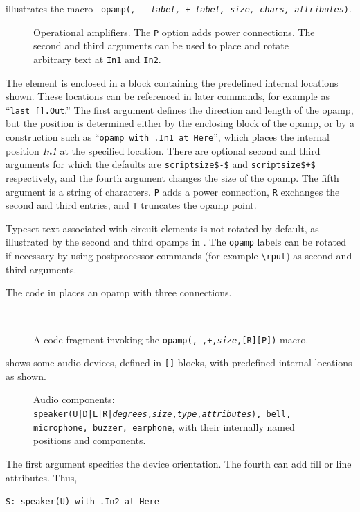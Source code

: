 \pagebreak
{} illustrates the macro {\tt
 opamp({\sl\linespec, - label, + label, size, chars, attributes})\label{OPAMP}}.
\begin{figure}[H]
   
   \caption{Operational amplifiers.  The {\tt P} option adds
     power connections.  The second and third arguments can be used
     to place and rotate arbitrary text at {\tt In1} and {\tt In2}.}
   \label{Opamp}
   \end{figure}
The element is enclosed in a block
containing the predefined internal locations shown.
These locations can be referenced in later
commands, for example as ``{\tt last [].Out}.''
The first argument defines the direction and length of the opamp, but the
position is determined either by the enclosing block of the opamp,
or by a construction such as ``{\tt opamp with .In1 at Here}'', which places
the internal position {\sl In1} at the specified location.
There are optional second and third arguments for which the defaults
are {\tt {}scriptsize\$-\$} and {\tt {}scriptsize\$+\$}
respectively, and the fourth argument changes the size of the opamp.
The fifth argument is a string of characters.  {\tt P}
adds a power connection, {\tt R} exchanges the second and
third entries, and {\tt T} truncates the opamp point.

\enlargethispage{\baselineskip}
Typeset text associated with circuit elements is not rotated by default,
as illustrated by the second and third opamps in .
The {\tt opamp} labels can be rotated if necessary by 
using postprocessor commands (for example \PSTricks \verb|\rput|)
as second and third arguments.

The code in  places an opamp with three connections.
\begin{figure}[H]
   \parbox{4in}{\small }%
   \quad\raise-0.2in\hbox{ }%
   \caption{A code fragment invoking the
    {\tt opamp(\linespec,-,+,{\sl size},[R][P])} macro.}
   \label{opampex}
   \end{figure}

 shows some audio devices, defined in {\tt []} blocks,
with predefined internal locations as shown.
\begin{figure}[H]
   
   \caption{Audio components:
   {\tt speaker(U|D|L|R|{\sl degrees},{\sl size},{\sl type},{\sl attributes}),
     bell, microphone, buzzer,
     earphone}, with their internally named positions and components.}
   \label{Audio}
   \end{figure}
The first argument specifies the device orientation.  The fourth can add
fill or line attributes.
Thus,
\par
{\tt S: speaker(U) with .In2 at Here}

